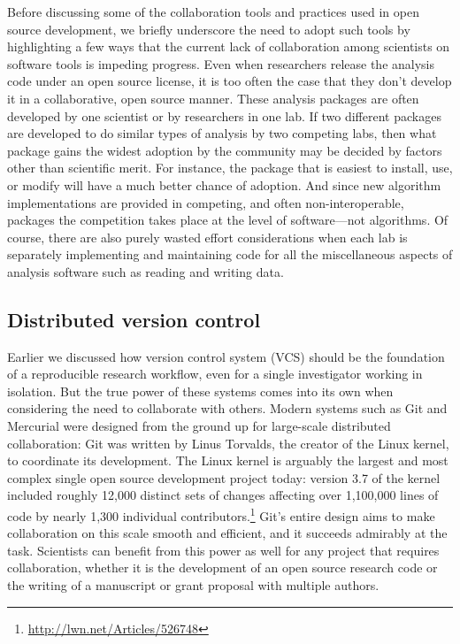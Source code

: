 \documentclass[ChapterTOCs,krantz2]{krantz} %
\begin{document}
Before discussing some of the collaboration tools and practices used in open
source development, we briefly underscore the need to adopt such tools
by highlighting a few ways that the current lack of collaboration among
scientists on software tools is impeding progress. Even when researchers
release the analysis code under an open source license, it is too often the
case that they don't develop it in a collaborative, open source manner.
These analysis packages are often developed by one scientist or by researchers
in one lab. If two different packages are developed to do similar types
of analysis by two competing labs, then what package gains the widest adoption
by the community may be decided by factors other than scientific merit. For
instance, the package that is easiest to install, use, or modify will have
a much better chance of adoption. And since new algorithm implementations
are provided in competing, and often non-interoperable, packages the
competition takes place at the level of software---not algorithms. Of course,
there are also purely wasted effort considerations when each lab is separately
implementing and maintaining code for all the miscellaneous aspects of
analysis software such as reading and writing data.

\subsection{Distributed version control}

Earlier we discussed how version control system (VCS) should be the foundation of a
reproducible research workflow, even for a single investigator working in
isolation.  But the true power of these systems comes into its own when
considering the need to collaborate with others.  Modern systems such as Git
and Mercurial were designed from the ground up for large-scale distributed
collaboration: Git was written by Linus Torvalds, the creator of the Linux
kernel, to coordinate its development.  The Linux kernel is arguably the
largest and most complex single open source development project today: version
3.7 of the kernel included roughly 12,000 distinct sets of changes affecting
over 1,100,000 lines of code by nearly 1,300 individual
contributors.\footnote{\url{http://lwn.net/Articles/526748}}  Git's entire
design aims to make collaboration on this scale smooth and efficient, and it
succeeds admirably at the task.  Scientists can benefit from this power as well
for any project that requires collaboration, whether it is the development of
an open source research code or the writing of a manuscript or grant proposal
with multiple authors.
\end{document}
